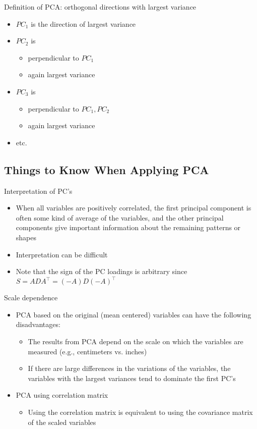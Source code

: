 \documentclass[a4paper]{article}
\begin{document}
Definition of PCA: orthogonal directions with largest variance
\begin{itemize}
    \item $PC_1$ is the direction of largest variance
    \item $PC_2$ is
    \begin{itemize}
        \item perpendicular to $PC_1$
        \item again largest variance
    \end{itemize}
    \item $PC_3$ is
    \begin{itemize}
        \item perpendicular to $PC_1, PC_2$
        \item again largest variance
    \end{itemize}
    \item etc.
\end{itemize}

\subsection{Things to Know When Applying PCA}

Interpretation of PC's
\begin{itemize}
    \item When all variables are positively correlated, the first principal component is often some kind of average of the variables, and the other principal components give important information about the remaining patterns or shapes
    \item Interpretation can be difficult
    \item Note that the sign of the PC loadings is arbitrary since $S=ADA^{\intercal}=(-A)D(-A)^{\intercal}$
\end{itemize}

Scale dependence
\begin{itemize}
    \item PCA based on the original (mean centered) variables can have the following disadvantages:
    \begin{itemize}
        \item The results from PCA depend on the scale on which the variables are measured (e.g., centimeters vs. inches)
        \item If there are large differences in the variations of the variables, the variables with the largest variances tend to dominate the first PC's
    \end{itemize}
    \item PCA using correlation matrix
    \begin{itemize}
        \item Using the correlation matrix is equivalent to using the covariance matrix of the scaled variables
    \end{itemize}
\end{itemize}
\end{document}
